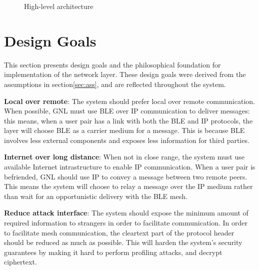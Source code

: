 \begin{figure}[htbp]
{%
}
\caption{High-level architecture}
\end{figure}

\section{Design Goals}
\label{sec:des}
This section presents design goals and the philosophical foundation for implementation of the network layer. These design goals were derived from the assumptions in section\ref{sec:ass}, and are reflected throughout the system.

\textbf{Local over remote}: The system should prefer local over remote communication.
When possible, GNL must use BLE over IP communication to deliver messages: this means, when a user pair has a link with both the BLE and IP protocols, the layer will choose BLE as a carrier medium for a message. This is because BLE involves less external components and exposes less information for third parties.

\textbf{Internet over long distance}: When not in close range, the system must use available Internet intrastructure to enable IP communication.
When a user pair is befriended, GNL should use IP to convey a message between two remote peers. This means the system will choose to relay a message over the IP medium rather than wait for an opportunistic delivery with the BLE mesh.

\textbf{Reduce attack interface}: The system should expose the minimum amount of required information to strangers in order to facilitate communication.
In order to facilitate mesh communication, the cleartext part of the protocol header should be reduced as much as possible. This will harden the system's security guarantees by making it hard to perform profiling attacks, and decrypt ciphertext.

